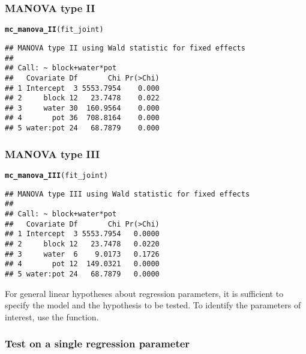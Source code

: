 \documentclass[article]{jss}\usepackage[]{graphicx}\usepackage[]{xcolor}
\makeatletter
\newcommand{\hlstd}[1]{\textcolor[rgb]{0.345,0.345,0.345}{#1}}%
\newcommand{\hlkwd}[1]{\textcolor[rgb]{0.737,0.353,0.396}{\textbf{#1}}}%
\newenvironment{kframe}{%
 \def\at@end@of@kframe{}%
 \ifinner\ifhmode%
  \def\at@end@of@kframe{\end{minipage}}%
  \begin{minipage}{\columnwidth}%
 \fi\fi%
 \def\FrameCommand##1{\hskip\@totalleftmargin \hskip-\fboxsep
 \colorbox{shadecolor}{##1}\hskip-\fboxsep
     \hskip-\linewidth \hskip-\@totalleftmargin \hskip\columnwidth}%
 \MakeFramed {\advance\hsize-\width
   \@totalleftmargin\z@ \linewidth\hsize
   \@setminipage}}%
 {\par\unskip\endMakeFramed%
 \at@end@of@kframe}
\newenvironment{knitrout}{}{} %
\makeatother
\begin{document}
\subsubsection{MANOVA type II}

\begin{knitrout}
\color{fgcolor}\begin{kframe}
\begin{alltt}
\hlkwd{mc_manova_II}\hlstd{(fit_joint)}
\end{alltt}
\begin{verbatim}
## MANOVA type II using Wald statistic for fixed effects
## 
## Call: ~ block+water*pot
##   Covariate Df       Chi Pr(>Chi)
## 1 Intercept  3 5553.7954    0.000
## 2     block 12   23.7478    0.022
## 3     water 30  160.9564    0.000
## 4       pot 36  708.8164    0.000
## 5 water:pot 24   68.7879    0.000
\end{verbatim}
\end{kframe}
\end{knitrout}

\subsubsection{MANOVA type III}

\begin{knitrout}
\color{fgcolor}\begin{kframe}
\begin{alltt}
\hlkwd{mc_manova_III}\hlstd{(fit_joint)}
\end{alltt}
\begin{verbatim}
## MANOVA type III using Wald statistic for fixed effects
## 
## Call: ~ block+water*pot
##   Covariate Df       Chi Pr(>Chi)
## 1 Intercept  3 5553.7954   0.0000
## 2     block 12   23.7478   0.0220
## 3     water  6    9.0173   0.1726
## 4       pot 12  149.0321   0.0000
## 5 water:pot 24   68.7879   0.0000
\end{verbatim}
\end{kframe}
\end{knitrout}

For general linear hypotheses about regression parameters, it is sufficient to specify the model and the hypothesis to be tested. To identify the parameters of interest, use the  function.

\subsubsection{Test on a single regression parameter}
\end{document}
